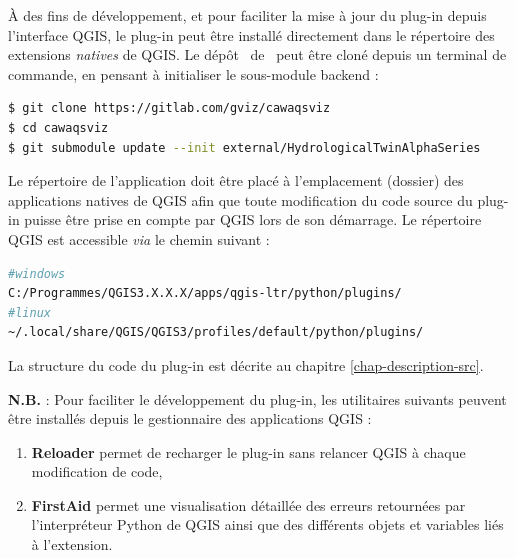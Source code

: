 À des fins de développement, et pour faciliter la mise à jour du plug-in depuis l'interface QGIS, le plug-in peut être installé directement dans le répertoire des extensions \emph{natives} de QGIS. Le dépôt \gitlab~de \cwv~peut être cloné depuis un terminal de commande, en pensant à initialiser le sous-module backend :

\begin{lstlisting}[language=bash]
$ git clone https://gitlab.com/gviz/cawaqsviz
$ cd cawaqsviz
$ git submodule update --init external/HydrologicalTwinAlphaSeries
\end{lstlisting}

Le répertoire de l'application doit être placé à l'emplacement (dossier) des applications natives de QGIS afin que toute modification du code source du plug-in puisse être prise en compte par QGIS lors de son démarrage. Le répertoire QGIS est accessible \textit{via} le chemin suivant :

\begin{lstlisting}[language=bash]
#windows
C:/Programmes/QGIS3.X.X.X/apps/qgis-ltr/python/plugins/
#linux
~/.local/share/QGIS/QGIS3/profiles/default/python/plugins/
\end{lstlisting}


La structure du code du plug-in est décrite au chapitre \ref{chap-description-src}.\\


\textbf{N.B.} : Pour faciliter le développement du plug-in, les utilitaires suivants peuvent être installés depuis le gestionnaire des applications QGIS :
\begin{enumerate}
    \item \textbf{Reloader} permet de recharger le plug-in sans relancer QGIS à chaque modification de code,
    \item \textbf{FirstAid} permet une visualisation détaillée des erreurs retournées par l'interpréteur Python de QGIS ainsi que des différents objets et variables liés à l'extension.
\end{enumerate}

